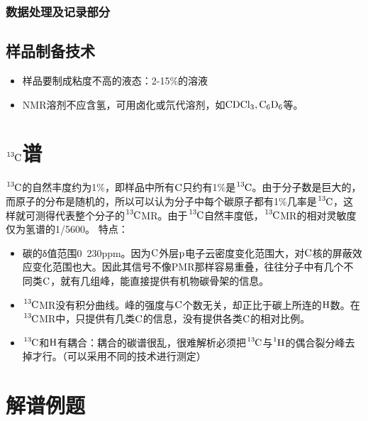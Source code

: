 \subsubsection{数据处理及记录部分}

\subsection{样品制备技术}
\begin{itemize}
	\item 样品要制成粘度不高的液态：2-15\%的溶液
	\item NMR溶剂不应含氢，可用卤化或氘代溶剂，如$\ce{CDCl3, C6D6}$等。
\end{itemize}


\section{$\ce{^{13}C}$谱}
$\ce{^{13}C}$的自然丰度约为1\%，即样品中所有$\ce{C}$只约有1\%是$\ce{^{13}C}$。由于分子数是巨大的，而原子的分布是随机的，所以可以认为分子中每个碳原子都有1\%几率是$\ce{^{13}C}$，这样就可测得代表整个分子的$\ce{^{13}C}$MR。由于$\ce{^{13}C}$自然丰度低，$\ce{^{13}C}$MR的相对灵敏度仅为氢谱的1/5600。
特点：
\begin{itemize}
	\item 碳的δ值范围0~230ppm。因为$\ce{C}$外层$\ce{p}$电子云密度变化范围大，对$\ce{C}$核的屏蔽效应变化范围也大。因此其信号不像PMR那样容易重叠，往往分子中有几个不同类$\ce{C}$，就有几组峰，能直接提供有机物碳骨架的信息。
	\item $\ce{^{13}C}$MR没有积分曲线。峰的强度与$\ce{C}$个数无关，却正比于碳上所连的$\ce{H}$数。在$\ce{^{13}C}$MR中，只提供有几类$\ce{C}$的信息，没有提供各类$\ce{C}$的相对比例。
	\item $\ce{^{13}C}$和$\ce{H}$有耦合：耦合的碳谱很乱，很难解析必须把$\ce{^{13}C}$与$\ce{^{1}H}$的偶合裂分峰去掉才行。（可以采用不同的技术进行测定）
\end{itemize}


\section{解谱例题}


